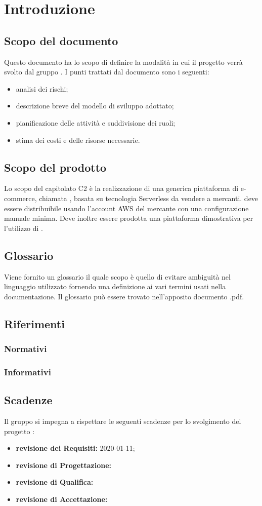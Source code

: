\section{Introduzione}
\subsection{Scopo del documento}
Questo documento ha lo scopo di definire la modalità in cui il progetto \nameproject{} verrà svolto dal gruppo \Omicron{}. I punti trattati dal documento sono i seguenti:
\begin{itemize}
\item analisi dei rischi;
\item descrizione breve del modello di sviluppo adottato;
\item pianificazione delle attività e suddivisione dei ruoli;
\item stima dei costi e delle risorse necessarie.
\end{itemize}
\subsection{Scopo del prodotto}
Lo scopo del capitolato C2 è la realizzazione di una generica piattaforma di e-commerce, chiamata \nameproject{}, basata su tecnologia Serverless da vendere a mercanti. \nameproject{} deve essere distribuibile usando l'account AWS del mercante con una configurazione manuale minima. Deve inoltre essere prodotta una piattaforma dimostrativa per l'utilizzo di \nameproject{}.
\subsection{Glossario}
Viene fornito un glossario il quale scopo è quello di evitare ambiguità nel linguaggio utilizzato fornendo una definizione ai vari termini usati nella documentazione. Il glossario può essere trovato nell'apposito documento \Glossario{}.pdf.
\subsection{Riferimenti}
\subsubsection{Normativi}
\subsubsection{Informativi}
\subsection{Scadenze}
Il gruppo \Omicron{} si impegna a rispettare le seguenti scadenze per lo svolgimento del progetto \nameproject{}:
\begin{itemize}
\item \textbf{revisione dei Requisiti:} 2020-01-11;
\item \textbf{revisione di Progettazione:} 
\item \textbf{revisione di Qualifica:}
\item \textbf{revisione di Accettazione:} 
\end{itemize}